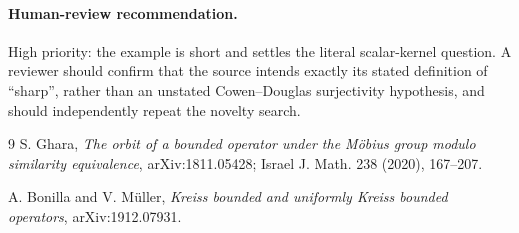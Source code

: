 \documentclass[11pt]{article}
\begin{document}
\paragraph{Human-review recommendation.}
High priority: the example is short and settles the literal scalar-kernel
question.  A reviewer should confirm that the source intends exactly its
stated definition of ``sharp'', rather than an unstated Cowen--Douglas
surjectivity hypothesis, and should independently repeat the novelty search.

\enlargethispage{2\baselineskip}
\small
\sloppy
\raggedright
\begin{thebibliography}{9}
S. Ghara,
\emph{The orbit of a bounded operator under the M\"obius group modulo
similarity equivalence},
arXiv:1811.05428; Israel J. Math. 238 (2020), 167--207.

A. Bonilla and V. M\"uller,
\emph{Kreiss bounded and uniformly Kreiss bounded operators},
arXiv:1912.07931.
\end{thebibliography}
\fussy
\normalsize
\end{document}
